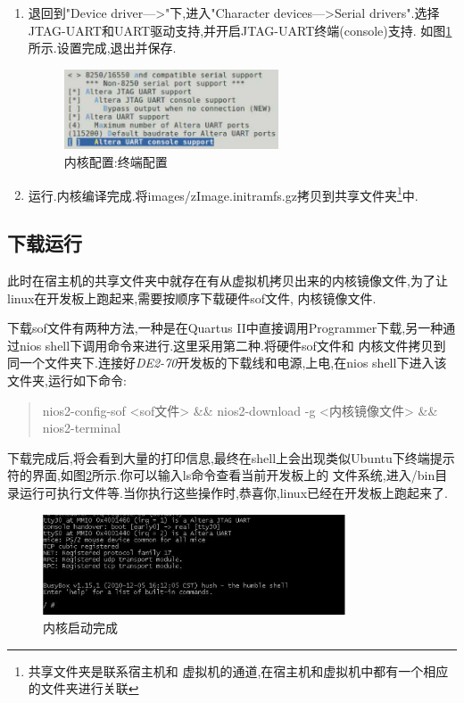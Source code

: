 \documentclass[12pt,a4paper,titlepage]{article}
\begin{document}
\begin{enumerate}
MAC Support(SLS)"选项取消\footnote{开发包默认使用Stratix的开发板和这一款网络驱动,与本工程不符.若不取消,编译报错.}.退出保存.
\item 退回到"Device driver--->"下,进入"Character devices--->Serial drivers".选择JTAG-UART和UART驱动支持,并开启JTAG-UART终端(console)支持.
如图\ref{f_kcfg_ct}所示.设置完成,退出并保存.
\begin{figure}[!bhtp]
\centering
\includegraphics[width=0.6\textwidth]{pic/f_kcfg_char_terminal.eps}
\caption{内核配置:终端配置\label{f_kcfg_ct}}
\end{figure}
\item 运行.内核编译完成.将images/zImage.initramfs.gz拷贝到共享文件夹\footnote{{共享文件夹是联系宿主机和
虚拟机的通道,在宿主机和虚拟机中都有一个相应的文件夹进行关联}}中.
\end{enumerate}
\subsection{下载运行}
此时在宿主机的共享文件夹中就存在有从虚拟机拷贝出来的内核镜像文件,为了让linux在开发板上跑起来,需要按顺序下载{硬件sof文件,
内核镜像文件}.

下载sof文件有两种方法,一种是在Quartus II中直接调用Programmer下载,另一种通过nios shell下调用命令来进行.这里采用第二种.将硬件sof文件和
内核文件拷贝到同一个文件夹下.连接好\textit{DE2-70}开发板的下载线和电源,上电,在nios shell下进入该文件夹,运行如下命令:
\begin{verse}
nios2-config-sof <sof文件> \&\& nios2-download -g <内核镜像文件> \&\& nios2-terminal
\end{verse}
下载完成后,将会看到大量的打印信息,最终在shell上会出现类似Ubuntu下终端提示符的界面,如图\ref{f_kb}所示.你可以输入ls命令查看当前开发板上的
文件系统,进入/bin目录运行可执行文件等.当你执行这些操作时,恭喜你,linux已经在开发板上跑起来了.
\begin{figure}[!bhtp]
\centering
\includegraphics[width=0.8\textwidth]{pic/f_kernel_bootingmsg.eps}
\caption{内核启动完成\label{f_kb}}
\end{figure}
\end{document}
